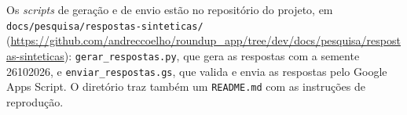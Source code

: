 \begin{apendicesenv}
Os \textit{scripts} de geração e de envio estão no repositório do projeto,
em \texttt{docs/pesquisa/respostas-sinteticas/}
(\url{https://github.com/andreccoelho/roundup_app/tree/dev/docs/pesquisa/respostas-sinteticas}):
\texttt{gerar\_respostas.py}, que gera as respostas com a semente
26102026, e \texttt{enviar\_respostas.gs}, que valida e envia as respostas
pelo Google Apps Script. O diretório traz também um \texttt{README.md} com
as instruções de reprodução.

\end{apendicesenv}
